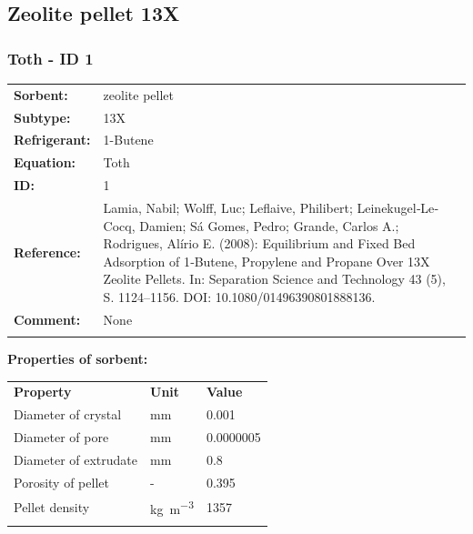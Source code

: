 \subsection{Zeolite pellet 13X}
%
\subsubsection{Toth - ID 1}
%
\begin{tabular}[l]{|lp{11.5cm}|}
\hline
\addlinespace

\textbf{Sorbent:} & zeolite pellet \\
\textbf{Subtype:} & 13X \\
\textbf{Refrigerant:} & 1-Butene \\
\textbf{Equation:} & Toth \\
\textbf{ID:} & 1 \\
\textbf{Reference:} & Lamia, Nabil; Wolff, Luc; Leflaive, Philibert; Leinekugel‐Le‐Cocq, Damien; Sá Gomes, Pedro; Grande, Carlos A.; Rodrigues, Alírio E. (2008): Equilibrium and Fixed Bed Adsorption of 1‐Butene, Propylene and Propane Over 13X Zeolite Pellets. In: Separation Science and Technology 43 (5), S. 1124–1156. DOI: 10.1080/01496390801888136. \\
\textbf{Comment:} & None \\

\addlinespace
\hline
\end{tabular}
\newline

\textbf{Properties of sorbent:}
\newline
%
\begin{longtable}[l]{lll}
\toprule
\addlinespace
\textbf{Property} & \textbf{Unit} & \textbf{Value} \\
\addlinespace
\midrule
\endhead
\bottomrule
\endfoot
\bottomrule
\endlastfoot
\addlinespace

Diameter of crystal & \si{\milli\meter} & 0.001\\
Diameter of pore & \si{\milli\meter} & 0.0000005\\
Diameter of extrudate & \si{\milli\meter} & 0.8\\
Porosity of pellet & - & 0.395\\
Pellet density & \si{\kilogram\per\cubic\meter} & 1357\\

\addlinespace\end{longtable}

